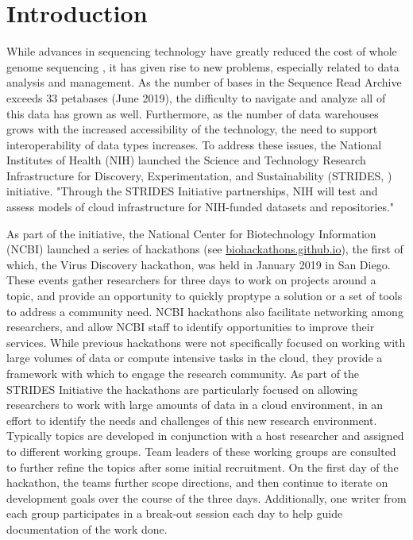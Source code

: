 \section{Introduction}

While advances in sequencing technology have greatly reduced the cost of whole
genome sequencing \cite{Mardis2011}, it has given rise to new problems, especially related to
data analysis and management. As the number of bases in the Sequence Read
Archive \cite{Kodama2012} exceeds 33 petabases (June 2019), the difficulty to navigate and
analyze all of this data has grown as well. Furthermore, as the number of data
warehouses grows with the increased accessibility of the technology, the need
to support interoperability of data types increases. To address these issues,
the National Institutes of Health (NIH) launched the Science and Technology
Research Infrastructure for Discovery, Experimentation, and Sustainability
(STRIDES, \cite{StridesWeb}) initiative. "Through the STRIDES Initiative partnerships, NIH
will test and assess models of cloud infrastructure for NIH-funded datasets and
repositories."

As part of the initiative, the National Center for Biotechnology Information
(NCBI) \cite{Sayers2019} launched a series of hackathons (see \url{biohackathons.github.io}), the
first of which, the Virus Discovery hackathon, was held in January 2019 in San
Diego. These events gather researchers for three days to work on projects
around a topic, and provide an opportunity to quickly proptype a solution or a
set of tools to address a community need. NCBI hackathons also facilitate
networking among researchers, and allow NCBI staff to identify opportunities to
improve their services. While previous hackathons were not specifically focused
on working with large volumes of data or compute intensive tasks in the cloud,
they provide a framework with which to engage the research community. As part
of the STRIDES Initiative the hackathons are particularly focused on allowing
researchers to work with large amounts of data in a cloud environment, in an
effort to identify the needs and challenges of this new research environment.
Typically topics are developed in conjunction with a host researcher and
assigned to different working groups. Team leaders of these working groups are
consulted to further refine the topics after some initial recruitment. On the
first day of the hackathon, the teams further scope directions, and then
continue to iterate on development goals over the course of the three days.
Additionally, one writer from each group participates in a break-out session
each day to help guide documentation of the work done.

